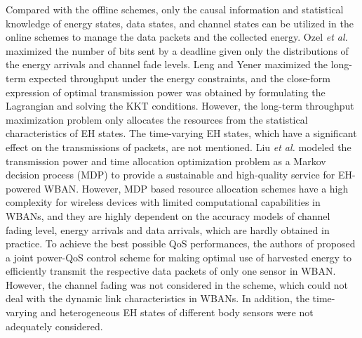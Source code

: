 \documentclass[journal,10pt]{IEEEtran}
\begin{document}
Compared with the offline schemes, only the causal information and statistical knowledge of energy states, data states, and channel states can be utilized in the online schemes to manage the data packets and the collected energy. 
Ozel \textsl{et al.} \cite{ozel2011transmission} maximized the number of bits sent by a deadline given only the distributions of the energy arrivals and channel fade levels. 
Leng and Yener \cite{leng2017resource} maximized the long-term expected throughput under the energy constraints, and the close-form expression of optimal transmission power was obtained by formulating the Lagrangian and solving the KKT conditions.
However, the long-term throughput maximization problem only allocates the resources from the statistical characteristics of EH states. The time-varying EH states, which have a significant effect on the transmissions of packets, are not mentioned. 
Liu \textsl{et al.} \cite{liu2015optimal} modeled the transmission power and time allocation optimization problem as a Markov decision process (MDP) to provide a sustainable and high-quality service for EH-powered WBAN. 
However, MDP based resource allocation schemes have a high complexity for wireless devices with limited computational capabilities in WBANs, and they are highly dependent on the accuracy models of channel fading level, energy arrivals and data arrivals, which are hardly obtained in practice. 
To achieve the best possible QoS performances, the authors of \cite{ibarra2016qos} proposed a joint power-QoS control scheme for making optimal use of harvested energy to efficiently transmit the respective data packets of only one sensor in WBAN. However, the channel fading was not considered in the scheme, which could not deal with the dynamic link characteristics in WBANs. In addition, the time-varying and heterogeneous EH states of different body sensors were not adequately considered.
\end{document}
